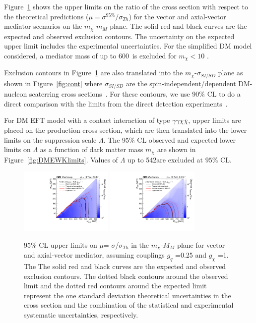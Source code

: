 Figure~\ref{fig:2d} shows the upper limits on the ratio of the cross section with respect
to the theoretical predictions ($\mu=
\sigma^{95\%}/\sigma_{Th}$) for the vector and axial-vector
mediator scenarios on the $m_\chi$-$m_M$ plane. The solid red and 
black curves are the expected and observed exclusion contours. The uncertainty on the 
expected upper limit includes the experimental uncertainties. For the simplified DM model
considered, a mediator mass of up to 600~\GeV is excluded for $m_\chi <10$ \GeV.

Exclusion contours in Figure~\ref{fig:2d} are also translated into the 
$m_\chi$-$\sigma_{SI/SD}$ plane as shown in Figure~\ref{fig:cont} where $\sigma_{SI/SD}$ are the 
spin-independent/dependent DM-nucleon scaterring cross sections~\cite{dmforum}. For 
these contours, we use 90\% CL to do a direct comparison
with the limits from the direct detection experiments~\cite{pico,pico1,lux1june}.

For DM EFT model with a contact interaction of type $\gamma\gamma\chi\overline{\chi}$, upper limits are placed on the production cross section, which are then translated into the lower limits on the suppression scale $\Lambda$. The 95\% CL observed and expected lower limits on $\Lambda$ as a function of dark matter mass $m_{\chi}$ are shown in Figure~\ref{fig:DMEWKlimits}. Values of $\Lambda$ up to 542\GeV are excluded at $95\%$ CL.

\begin{figure}[htb]
\caption[Exclusion plots in $m_{\chi}-m_M$ plane]{95\% CL upper limits on $\mu$= $\sigma$/$\sigma_{Th}$ in the $m_{\chi}$-$M_{M}$ plane for vector and axial-vector mediator, assuming couplings $g_{q}$ =0.25 and $g_{\chi}$ =1.
The The solid red and black curves are the expected and observed exclusion contours. 
The dotted black contours around the observed limit and the
 dotted red contours around the expected limit represent the
 one standard deviation theoretical uncertainties in the cross
 section and the combination of the statistical and experimental
 systematic uncertainties, respectively.}
\label{fig:2d}
\begin{center}
\includegraphics[width=0.4\textwidth]{pdfs/lgxc/fromb/V.pdf}
\includegraphics[width=0.4\textwidth]{pdfs/lgxc/fromb/AV.pdf}
\end{center}
\end{figure}


